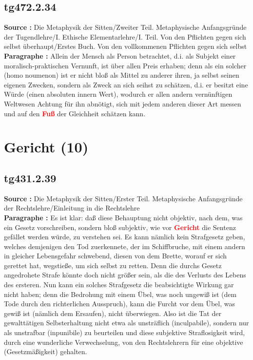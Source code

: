 \documentclass[a4paper,12pt,twoside]{book}
\newcommand{\match}[1]{\textcolor{red}{\textbf{#1}}}
\newcommand{\unnumberedsection}[1]{
	\section*{#1}
	\addcontentsline{toc}{section}{#1}
	\markright{#1}
}
\begin{document}
	\subsection*{tg472.2.34} 
	\textbf{Source : }Die Metaphysik der Sitten/Zweiter Teil. Metaphysische Anfangsgründe der Tugendlehre/I. Ethische Elementarlehre/I. Teil. Von den Pflichten gegen sich selbst überhaupt/Erstes Buch. Von den vollkommenen Pflichten gegen sich selbst\\  
	
	\textbf{Paragraphe : }Allein der Mensch als Person betrachtet, d.i. als Subjekt einer moralisch-praktischen Vernunft, ist über allen Preis erhaben; denn als ein solcher (homo noumenon) ist er nicht bloß als Mittel zu anderer ihren, ja selbst seinen eigenen Zwecken, sondern als Zweck an sich seihst zu schätzen, d.i. er besitzt eine Würde (einen absoluten innern Wert), wodurch er allen andern vernünftigen Weltwesen Achtung für ihn abnötigt, sich mit jedem anderen dieser Art messen und auf den \match{Fuß} der Gleichheit schätzen kann. 
	
	\unnumberedsection{Gericht (10)} 
	\subsection*{tg431.2.39} 
	\textbf{Source : }Die Metaphysik der Sitten/Erster Teil. Metaphysische Anfangsgründe der Rechtslehre/Einleitung in die Rechtslehre\\  
	
	\textbf{Paragraphe : }Es ist klar: daß diese Behauptung nicht objektiv, nach dem, was ein Gesetz vorschreiben, sondern bloß subjektiv, wie vor \match{Gericht} die Sentenz gefället werden würde, zu verstehen sei. Es kann nämlich kein Strafgesetz geben, welches demjenigen den Tod zuerkennete, der im Schiffbruche, mit einem andern in gleicher Lebensgefahr schwebend, diesen von dem Brette, worauf er sich gerettet hat, wegstieße, um sich selbst zu retten. Denn die durchs Gesetz angedrohete Strafe könnte doch nicht größer sein, als die des Verlusts des Lebens des ersteren. Nun kann ein solches Strafgesetz die beabsichtigte Wirkung gar nicht haben; denn die Bedrohung mit einem Übel, was noch ungewiß ist (dem Tode durch den richterlichen Ausspruch), kann die Furcht vor dem Übel, was gewiß ist (nämlich dem Ersaufen), nicht überwiegen. Also ist die Tat der gewalttätigen Selbsterhaltung nicht etwa als unsträflich (inculpabile), sondern nur als unstrafbar (inpunibile) zu beurteilen und diese subjektive Straflosigkeit wird, durch eine wunderliche Verwechselung, von den Rechtslehrern für eine objektive (Gesetzmäßigkeit) gehalten. 
	
\end{document}
